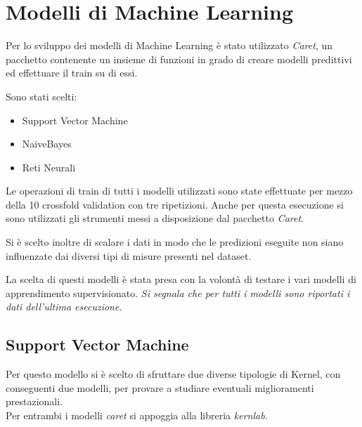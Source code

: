 \chapter{Modelli di Machine Learning}
Per lo sviluppo dei modelli di Machine Learning è stato utilizzato
\textit{Caret}, un pacchetto contenente un insieme di funzioni in grado di 
creare modelli predittivi ed effettuare il train su di essi.

Sono stati scelti:
\begin{itemize}
    \item Support Vector Machine
    \item NaiveBayes
    \item Reti Neurali
\end{itemize}

Le operazioni di train di tutti i modelli utilizzati sono state effettuate 
per mezzo della 10 crossfold validation con tre ripetizioni. 
Anche per questa esecuzione si sono utilizzati 
gli strumenti messi a disposizione dal pacchetto \textit{Caret}.

Si è scelto inoltre di scalare i dati in modo che le predizioni eseguite non siano 
influenzate dai diversi tipi di misure presenti nel dataset.

La scelta di questi modelli è stata presa con la volontà di testare i vari
modelli di apprendimento supervisionato.
\textit{Si segnala che per tutti i modelli sono riportati i dati dell'ultima 
esecuzione.}
\section{Support Vector Machine}
Per questo modello si è scelto di sfruttare due diverse tipologie di Kernel, con
conseguenti due modelli, per provare a studiare eventuali miglioramenti 
prestazionali. \\
Per entrambi i modelli \textit{caret} si appoggia alla libreria 
\textit{kernlab}.

